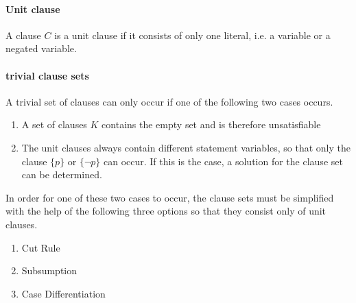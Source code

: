 \paragraph{Unit clause}
A clause $C$ is a unit clause if it consists of only one literal, i.e. a variable or a negated variable.

\paragraph{trivial clause sets}
A trivial set of clauses can only occur if one of the following two cases occurs.

\begin{enumerate}
\item A set of clauses $K$ contains the empty set and is therefore unsatisfiable
\item The unit clauses always contain different statement variables, so that only the clause $\{p\}$ or $\{\neg p\}$ can occur. If this is the case, a solution for the clause set can be determined.
\end{enumerate}

In order for one of these two cases to occur, the clause sets must be simplified with the help of the following three options so that they consist only of unit clauses.

\begin{enumerate}
\item Cut Rule 
\item Subsumption
\item Case Differentiation
\end{enumerate}

